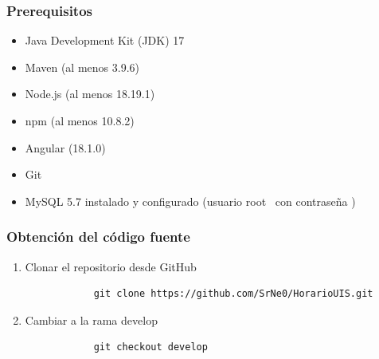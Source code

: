 \documentclass{article} %
\begin{document}
    \subsubsection{Prerequisitos}
    \begin{itemize}
        \item Java Development Kit (JDK) 17
        \item Maven (al menos 3.9.6)
        \item Node.js (al menos 18.19.1)
        \item npm (al menos 10.8.2)
        \item Angular (18.1.0)
        \item Git
        \item MySQL 5.7 instalado y configurado (usuario \guillemotleft root\guillemotright~ con contraseña \guillemotright)
    \end{itemize}
    
    \subsubsection{Obtención del código fuente}
    \begin{enumerate}[font=\bfseries]
        \item Clonar el repositorio desde GitHub
        \begin{verbatim}
            git clone https://github.com/SrNe0/HorarioUIS.git
        \end{verbatim}
        \item Cambiar a la rama \guillemotleft develop\guillemotright
        \begin{verbatim}
            git checkout develop
        \end{verbatim}
    \end{enumerate}
\end{document}

